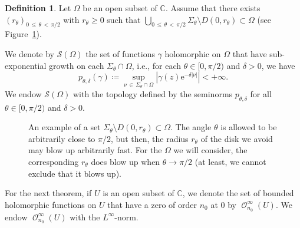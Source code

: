 \documentclass[10pt]{amsart}
\theoremstyle{definition}\newtheorem{defi}[theo]{Definition}\newtheorem{rema}[theo]{Remark}\newtheorem{exam}[theo]{Example}\newtheorem{exem}[theo]{Example}\newtheorem{nota}[theo]{Notation}
\renewcommand{\leq}{\leqslant}
\renewcommand{\geq}{\geqslant}
\newcommand{\1}{\mathds 1}
\DeclareMathOperator{\Hol}{\mathcal O}
\newcommand{\C}{\mathbb{C}}
\newcommand{\Sc}{{\mathcal S}}
\newcommand{\eu}{\mathrm e}
\newcommand{\sector}[1][\theta_0]{\Sigma_{#1}}
\renewcommand{\d}{\delta}
\renewcommand{\th}{\theta}
\begin{document}
\begin{defi}\label{def-symbols}
Let $\Omega$ be an open subset of $\C$. Assume that there exists $(r_\th)_{0\,\leq\,\th\,<\,\pi/2}$ with $r_\th \geq 0$ such that $\bigcup_{0\,\leq\,\th\,<\,\pi/2}\sector[\th]\setminus D(0,r_\th) \subset \Omega$ (see Figure~\ref{fig:U_r_theta}).

We denote by $\Sc(\Omega)$ the set of functions $\gamma$ holomorphic on $\Omega$ that have sub-exponential growth on each $\sector[\th]\cap \Omega$, i.e., for each $\theta\in [0,\pi/2)$ and $\d>0$, we have
\[
p_{\theta,\d}(\gamma) \coloneqq \sup_{\nu\,\in\,\sector[\th] \cap \Omega} \left|\gamma(z)\eu^{-\d|\nu|}\right| < +\infty.
\]
We endow $\Sc(\Omega)$ with the topology defined by the seminorms $p_{\theta,\d}$ for all $\theta\in[0,\pi/2)$ and $\d>0$.
\end{defi}

\begin{figure}[ht]
\begin{center}
\end{center}
\caption{An example of a set $\sector[\th]\setminus D(0,r_\th) \subset \Omega$. The angle $\theta$ is allowed to be arbitrarily close to $\pi/2$, but then, the radius $r_\theta$ of the disk we avoid may blow up arbitrarily fast. For the $\Omega$ we will consider, the corresponding $r_\theta$ does blow up when $\theta \to \pi/2$ (at least, we cannot exclude that it blows up).}\label{fig:U_r_theta}
\end{figure}

For the next theorem, if $U$ is an open subset of $\C$, we denote the set of bounded holomorphic functions on $U$ that have a zero of order $n_0$ at $0$ by $\Hol^\infty_{n_0}(U)$. We endow $\Hol^\infty_{n_0}(U)$ with the $L^\infty$-norm.
\end{document}
